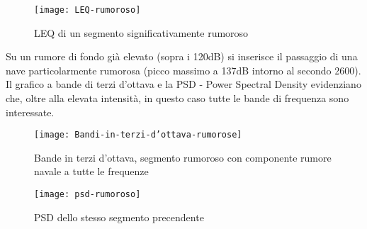 \begin{figure}[h]
\centering
\texttt{[image: LEQ-rumoroso]}
\caption{LEQ di un segmento significativamente rumoroso}
\end{figure}

Su un rumore di fondo già elevato (sopra i 120dB) si inserisce il passaggio di una nave particolarmente rumorosa (picco massimo a 137dB intorno al secondo 2600). 
Il grafico a bande di terzi d’ottava e la PSD - Power Spectral Density evidenziano che, oltre alla elevata intensità, in questo caso tutte le bande di frequenza sono interessate. 

\begin{figure}[h]
\centering
\texttt{[image: Bandi-in-terzi-d'ottava-rumorose]}
\caption{Bande in terzi d’ottava, segmento rumoroso con componente rumore navale a tutte le frequenze}
\end{figure}

\begin{figure}[h]
\centering
\texttt{[image: psd-rumoroso]}
\caption{PSD dello stesso segmento precendente}
\end{figure}















